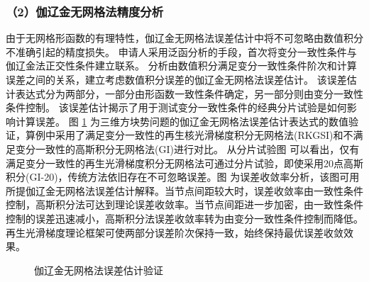 \subsubsection*{\bfseries （2）伽辽金无网格法精度分析}
由于无网格形函数的有理特性，伽辽金无网格法误差估计中将不可忽略由数值积分不准确引起的精度损失。
申请人采用泛函分析的手段，首次将变分一致性条件与伽辽金法正交性条件建立联系。
分析由数值积分满足变分一致性条件阶次和计算误差之间的关系，建立考虑数值积分误差的伽辽金无网格法误差估计。
该误差估计表达式分为两部分，一部分由形函数一致性条件确定，另一部分则由变分一致性条件控制。
该误差估计揭示了用于测试变分一致性条件的经典分片试验是如何影响计算误差。
图 \ref{fg:cube} 为三维方块势问题的伽辽金无网格法误差估计表达式的数值验证，算例中采用了满足变分一致性的再生核光滑梯度积分无网格法(RKGSI)和不满足变分一致性的高斯积分无网格法(GI)进行对比。
从分片试验图  可以看出，仅有满足变分一致性的再生光滑梯度积分无网格法可通过分片试验，即使采用20点高斯积分(GI-20)，传统方法依旧存在不可忽略误差。图  为误差收敛率分析，该图可用所提伽辽金无网格法误差估计解释。当节点间距较大时，误差收敛率由一致性条件控制，高斯积分法可达到理论误差收敛率。当节点间距进一步加密，由一致性条件控制的误差迅速减小，高斯积分法误差收敛率转为由变分一致性条件控制而降低。再生光滑梯度理论框架可使两部分误差阶次保持一致，始终保持最优误差收敛效果。

\begin{figure}[!h]
    \centering 
    \caption{伽辽金无网格法误差估计验证}
    \label{fg:cube}
\end{figure}

